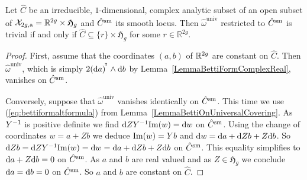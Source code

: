 \begin{corollary}\label{CorBettiFormVanishingDirection}
  Let $\hat{C}$ be an irreducible, $1$-dimensional, complex analytic
  subset of an open subset of $\mathcal X_{2g,\mathrm{a}}
  = {\mathbb{R}}^{2g} \times \mathfrak{H}_g$ and ${\hat {C}}^{\mathrm{sm}}$ its smooth
  locus. Then $\hat{\omega}^{\mathrm{univ}}$ restricted to ${\hat C}^{\mathrm{sm}}$
  is trivial if and only if
  $\hat{C} \subseteq \{r\} \times \mathfrak{H}_g$ for some
  $r \in \mathbb R^{2g}$.
\end{corollary}
\begin{proof}
  First, assume that the coordinates $(a,b)$ of ${\mathbb{R}}^{2g}$ are constant on
  $\hat C$. Then $\hat{\omega}^{\mathrm{univ}}$, which is simply
  $2 {{(\mathrm{d} a)}}^{\!^{\intercal}} \wedge \mathrm{d}b$ by
  Lemma~\ref{LemmaBettiFormComplexReal}, vanishes on ${\hat C}^{\mathrm{sm}}$.

  Conversely, suppose that $\hat{\omega}^{\mathrm{univ}}$ vanishes
  identically on ${\hat C}^{\mathrm{sm}}$. This time we use (\ref{eq:bettiformaltformula}) from 
  Lemma~\ref{LemmaBettiOnUniversalCovering}. As $Y^{-1}$ is positive
  definite we find $\mathrm{d} Z Y^{-1} \mathrm{Im}(w) = \mathrm{d} w$ on ${\hat C}^{\mathrm{sm}}$.
  Using the change of coordinates $w = a+Zb$ we deduce $\mathrm{Im}(w) = Y b$
  and $\mathrm{d} w = \mathrm{d} a
  + \mathrm{d} Z b +Z\mathrm{d} b$. So $\mathrm{d} Z b  =\mathrm{d} Z Y^{-1} \mathrm{Im}(w)
  = \mathrm{d} w=  \mathrm{d} a
  + \mathrm{d} Z b + Z\mathrm{d} b$ on ${\hat C}^{\mathrm{sm}}$. This equality simplifies to
  $\mathrm{d} a + Z \mathrm{d} b = 0$ on ${\hat C}^{\mathrm{sm}}$. As $a$ and $b$ are real
  valued and as $Z\in \mathfrak{H}_g$ we conclude $\mathrm{d} a = \mathrm{d} b =0$
  on ${\hat C}^{\mathrm{sm}}$. So $a$ and $b$ are constant on $\hat C$.
\end{proof}


